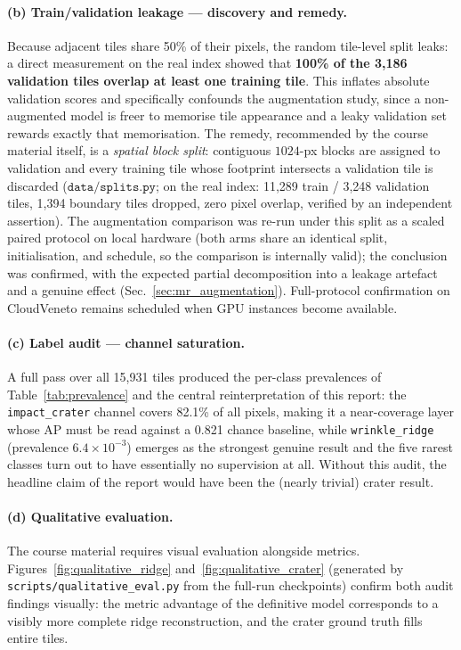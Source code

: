 \paragraph{(b) Train/validation leakage --- discovery and remedy.}
Because adjacent tiles share 50\% of their pixels, the random tile-level split leaks: a direct measurement on the real index showed that \textbf{100\% of the 3{,}186 validation tiles overlap at least one training tile}. This inflates absolute validation scores and specifically confounds the augmentation study, since a non-augmented model is freer to memorise tile appearance and a leaky validation set rewards exactly that memorisation. The remedy, recommended by the course material itself, is a \emph{spatial block split}: contiguous $1024$-px blocks are assigned to validation and every training tile whose footprint intersects a validation tile is discarded ($\texttt{data/splits.py}$; on the real index: 11{,}289 train / 3{,}248 validation tiles, 1{,}394 boundary tiles dropped, zero pixel overlap, verified by an independent assertion). The augmentation comparison was re-run under this split as a scaled paired protocol on local hardware (both arms share an identical split, initialisation, and schedule, so the comparison is internally valid); the conclusion was confirmed, with the expected partial decomposition into a leakage artefact and a genuine effect (Sec.~\ref{sec:mr_augmentation}). Full-protocol confirmation on CloudVeneto remains scheduled when GPU instances become available.

\paragraph{(c) Label audit --- channel saturation.}
A full pass over all 15{,}931 tiles produced the per-class prevalences of Table~\ref{tab:prevalence} and the central reinterpretation of this report: the \texttt{impact\_crater} channel covers 82.1\% of all pixels, making it a near-coverage layer whose AP must be read against a 0.821 chance baseline, while \texttt{wrinkle\_ridge} (prevalence $6.4\times10^{-3}$) emerges as the strongest genuine result and the five rarest classes turn out to have essentially no supervision at all. Without this audit, the headline claim of the report would have been the (nearly trivial) crater result.

\paragraph{(d) Qualitative evaluation.}
The course material requires visual evaluation alongside metrics. Figures~\ref{fig:qualitative_ridge} and~\ref{fig:qualitative_crater} (generated by \texttt{scripts/qualitative\_eval.py} from the full-run checkpoints) confirm both audit findings visually: the metric advantage of the definitive model corresponds to a visibly more complete ridge reconstruction, and the crater ground truth fills entire tiles.

